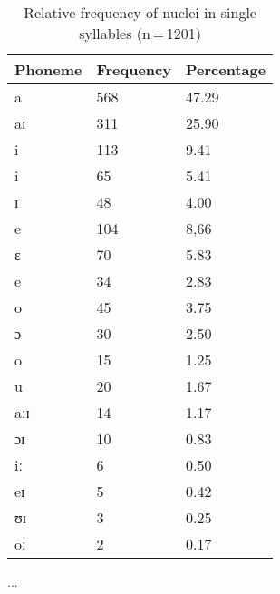 \begin{table}[hp]\centering
\caption[Relative frequency of nuclei in single syllables]{Relative frequency of nuclei in single syllables (n\,=\,1201)}
\begin{tabu} to 0.5\textwidth{X X[c] X[c]}
\tableheaderfont\toprule
Phoneme
	& Frequency
	& Percentage
	\\
	
\toprule

a
	& 568
	& 47.29\pct
	\\
aɪ
	& 311
	& 25.90\pct
	\\
i
	& 113
	& 9.41\pct
	\\
\rowfont{\footnotesize\itshape}
\raggedleft
i
	& 65
	& 5.41\pct
	\\
\rowfont{\footnotesize\itshape}
\raggedleft
ɪ
	& 48
	& 4.00\pct
	\\
e
	& 104
	& 8,66\pct
	\\
\rowfont{\footnotesize\itshape}
\raggedleft 
ɛ
	& 70
	& 5.83\pct
	\\
\rowfont{\footnotesize\itshape}
\raggedleft
e
	& 34
	& 2.83\pct
	\\
o
	& 45
	& 3.75\pct
	\\
\rowfont{\footnotesize\itshape}
\raggedleft
ɔ
	& 30
	& 2.50\pct
	\\
\rowfont{\footnotesize\itshape}
\raggedleft
o
	& 15
	& 1.25\pct
	\\
u
	& 20
	& 1.67\pct
	\\
aːɪ
	& 14
	& 1.17\pct
	\\
ɔɪ
	& 10
	& 0.83\pct
	\\
iː
	& 6
	& 0.50\pct
	\\
eɪ
	& 5
	& 0.42\pct
	\\
ʊɪ
	& 3
	& 0.25\pct
	\\
oː
	& 2
	& 0.17\pct
	\\

\bottomrule
\end{tabu}
\label{tab:singnuc}
\end{table}

...


